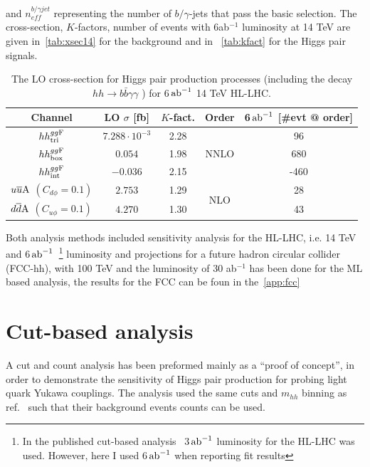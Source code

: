 and $n_{eff}^{b/\gamma jet}$ representing the number of $b/\gamma$-jets that pass the basic selection. The cross-section, $K$-factors, number of events with 6ab$^{-1}$ luminosity at 14 TeV are given in~\autoref{tab:xsec14} for the background and in~ \autoref{tab:kfact} for the Higgs pair signals. 
\begin{table}[t]
	\centering
	\begin{tabular}{ccccc}
		\toprule
		Channel	        &LO $\sigma $ [fb]	&$K$-fact.	&Order&6$\,{\rm ab}^{-1}$ [\#evt @ order]   \\
		\midrule
		$hh^{gg\rm F}_{\rm tri}$	        &  $7.288 \cdot10^{-3}$    & 2.28 &\multirow{3}{*}{NNLO}   &  96   \\ 
		$hh^{gg\rm F}_{\rm box}$            & $0.054$    & 1.98 &  & 680   \\ 
		$hh^{gg\rm F}_{\rm int}$            &$-0.036$    & 2.15 &  &-460   \\ 
		$u\overline u \rm A$ $(C_{d\phi}=0.1)$ &  $2.753$    & 1.29&\multirow{2}{*}{NLO} &  28   \\ 
		$d\overline d \rm A$ $(C_{u\phi}=0.1)$ &  $4.270$    & 1.30 & &  43   \\ 
		\bottomrule
	\end{tabular}
	\caption{  The LO cross-section for Higgs pair production processes (including the decay $hh \to b \bar b \gamma \gamma$ ) for 6$\,{\rm ab}^{-1}$ 14 TeV HL-LHC.}
	\label{tab:kfact}
\end{table}
Both analysis methods included sensitivity analysis for the HL-LHC, i.e. 14 TeV and 6$\,{\rm ab}^{-1}$~\footnote{In the published cut-based analysis~\cite{Alasfar:2019pmn} 3$\,{\rm ab}^{-1}$ luminosity for the HL-LHC was used. However, here I used 6$\,{\rm ab}^{-1}$ when reporting fit results} luminosity and projections for a future hadron circular collider (FCC-hh), with 100 TeV and the luminosity of 30 ab$^{-1}$ has been done for the ML based analysis, the results for the FCC can be foun in the~\autoref{app:fcc}



\section{Cut-based analysis \label{sec:cutbasedly}}
A cut and count analysis has been preformed mainly as a ``proof of concept'', in order to demonstrate the sensitivity of Higgs pair production for probing light quark Yukawa couplings.  The analysis used the same cuts and $m_{hh}$ binning as ref.~\cite{Azatov:2015oxa} such that their background events counts can be used. 
